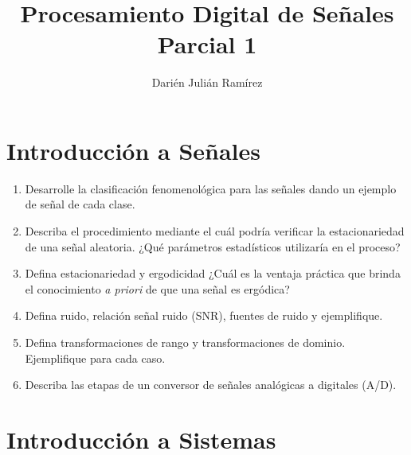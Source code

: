 \documentclass[a4paper,10pt,spanish]{article}
\title{\Huge Procesamiento Digital de Señales\\
Parcial 1}
\author{Darién Julián Ramírez}
\date{\vspace{-5ex}}
\begin{document}
\maketitle %

\section{Introducción a Señales}

\begin{enumerate}
\item Desarrolle la clasificación fenomenológica para las señales dando un ejemplo de señal de cada clase.

\item Describa el procedimiento mediante el cuál podría verificar la estacionariedad de una señal aleatoria. ¿Qué parámetros estadísticos utilizaría en el proceso?

\item Defina estacionariedad y ergodicidad ¿Cuál es la ventaja práctica que brinda el conocimiento \textit{a priori} de que una señal es ergódica?

\item Defina ruido, relación señal ruido (SNR), fuentes de ruido y ejemplifique.

\item Defina transformaciones de rango y transformaciones de dominio. Ejemplifique para cada caso.

\item Describa las etapas de un conversor de señales analógicas a digitales (A/D).
\end{enumerate}

\section{Introducción a Sistemas}
\end{document}
